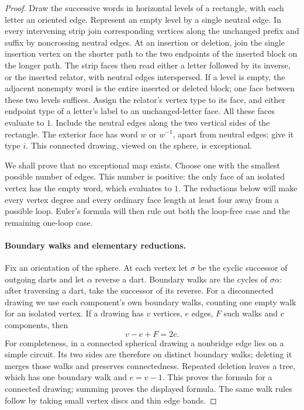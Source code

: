 \begin{proof}
Draw the successive words in horizontal levels of a rectangle, with
each letter an oriented edge.  Represent an empty level by a single
neutral edge.  In every intervening strip join corresponding vertices
along the unchanged prefix and suffix by noncrossing neutral edges.
At an insertion or deletion, join the single insertion vertex on the
shorter path to the two endpoints of the inserted block on the longer
path.  The strip faces then read either a letter followed by its inverse,
or the inserted relator, with neutral edges interspersed.  If a level is
empty, the adjacent nonempty word is the entire inserted or deleted
block; one face between these two levels suffices.  Assign the relator's
vertex type to its face, and either endpoint type of a letter's label
to an unchanged-letter face.  All these faces evaluate to $1$.  Include
the neutral edges along the two vertical sides of the rectangle.  The
exterior face has word $w$ or $w^{-1}$, apart from neutral edges; give it
type $i$.  This connected drawing, viewed on the sphere, is exceptional.

We shall prove that no exceptional map exists.  Choose one with the
smallest possible number of edges.  This number is positive: the only
face of an isolated vertex has the empty word, which evaluates to $1$.
The reductions below will make every vertex degree and every ordinary
face length at least four away from a possible loop. Euler's formula
will then rule out both the loop-free case and the remaining one-loop
case.

\paragraph{Boundary walks and elementary reductions.}
Fix an orientation of the sphere.  At each vertex let $\sigma$ be the
cyclic successor of outgoing darts and let $\alpha$ reverse a dart.
Boundary walks are the cycles of $\sigma\alpha$: after traversing a
dart, take the successor of its reverse.  For a disconnected drawing we
use each component's own boundary walks, counting one empty walk for
an isolated vertex.  If a drawing has $v$ vertices, $e$ edges, $F$ such
walks and $c$ components, then
\begin{equation}\label{eq:gluing-euler}
 v-e+F=2c.
\end{equation}
For completeness, in a connected spherical drawing a nonbridge edge
lies on a simple circuit.  Its two sides are therefore on distinct
boundary walks; deleting it merges those walks and preserves
connectedness.  Repeated deletion leaves a tree, which has one boundary
walk and $e=v-1$.  This proves the formula for a connected drawing;
summing proves the displayed formula.  The same walk rules follow by
taking small vertex discs and thin edge bands.


\end{proof}
